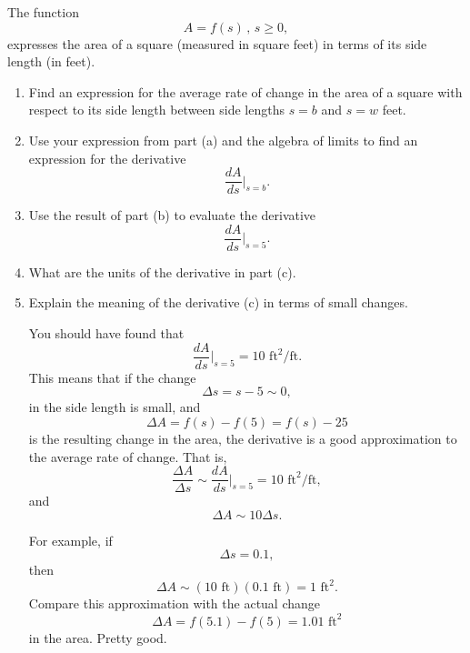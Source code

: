 \documentclass{ximera}
\begin{document}
\begin{question}  \label{QPodfoitte43}
The function
\[
         A = f(s) \, , \, s\geq 0 ,
\]
expresses the area of a square (measured in square feet) in terms of its side length (in feet).

\begin{enumerate}
\item Find an expression for the average rate of change in the area of a square with respect to its side length between side lengths $s=b$ and $s=w$ feet.

\item Use your expression from part (a) and the algebra of limits to find an expression for the derivative
\[
      \frac{dA}{ds}\Big|_{s=b}.
\]

\item Use the result of part (b) to evaluate the derivative
\[
   \frac{dA}{ds}\Big|_{s=5}.
\]

\item What are the units of the derivative in part (c).

\item Explain the meaning of the derivative (c) in terms of small changes.

\begin{explanation}
You should have found that
\[
    \frac{dA}{ds}\Big|_{s=5} = 10 \text{ ft}^2/\text{ft} .
\]
This means that if the change
\[
    \Delta s = s-5 \sim 0,
\]
in the side length is small, and  
\[
   \Delta A = f(s) - f(5) = f(s)-25
\]
is the resulting change in the area, the derivative is a good approximation to the average rate of change. That is,
\[
  \frac{\Delta A}{\Delta s} \sim \frac{dA}{ds}\Big|_{s=5} = 10 \text{ ft}^2/\text{ft},
\]
and
\[
   \Delta A \sim 10 \Delta s. 
\]

For example, if 
\[
 \Delta s = 0.1 ,
\]
then 
\[
    \Delta A \sim (10 \text{ ft} ) (0.1 \text{ ft}) = 1 \text{ ft}^2.
\]
Compare this approximation with the actual change
\[
   \Delta A = f(5.1) - f(5) = 1.01 \text{ ft}^2
\]
in the area. Pretty good.
\end{explanation}

\end{enumerate}

\end{question}
\end{document}
